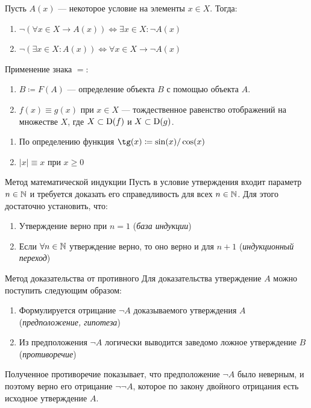 \begin{example}{}{}
    Пусть $A(x)$ --- некоторое условие на элементы $x \in X$. Тогда:
    \begin{enumerate}
        \item $\neg (\forall x \in X \to A(x)) \iff \exists x \in X \colon \neg A(x)$
        \item $\neg (\exists x \in X \colon A(x)) \iff \forall x \in X \to \neg A(x)$
    \end{enumerate}
\end{example}

Применение знака $=$:
\begin{enumerate}
    \item $B \coloneqq F(A)$ --- определение объекта $B$ с помощью объекта $A$.
    \item $f(x) \equiv g(x)$ при $x \in X$ --- тождественное равенство отображений на множестве $X$,
        где $X \subset \operatorname{D}(f)$ и $X \subset \operatorname{D}(g)$.
\end{enumerate}

\begin{example}{}{}
    \begin{enumerate}
        \item По определению функция $\tg(x) \coloneqq \sin(x) / \cos(x)$
        \item $|x| \equiv x$ при $x \ge 0$
    \end{enumerate}
\end{example}

\begin{theorem}{Метод математической индукции}{}
    Пусть в условие утверждения входит параметр $n \in \mathbb{N}$
    и требуется доказать его справедливость для всех $n \in \mathbb{N}$.
    Для этого достаточно установить, что:
    \begin{enumerate}
        \item Утверждение верно при $n = 1$ (\textit{база индукции})
        \item Если $\forall n \in \mathbb{N}$ утверждение верно,
            то оно верно и для $n+1$ (\textit{индукционный переход})
    \end{enumerate}
\end{theorem}

\begin{theorem}{Метод доказательства от противного}{}
    Для доказательства утверждение $A$ можно поступить следующим образом:
    \begin{enumerate}
        \item Формулируется отрицание $\neg A$ доказываемого утверждения $A$
            (\textit{предположение, гипотеза})
        \item Из предположения $\neg A$ логически выводится
            заведомо ложное утверждение $B$ (\textit{противоречие})
    \end{enumerate}
    Полученное противоречие показывает, что предположение $\neg A$ было неверным,
    и поэтому верно его отрицание $\neg \neg A$, которое
    по закону двойного отрицания есть исходное утверждение $A$.
\end{theorem}
